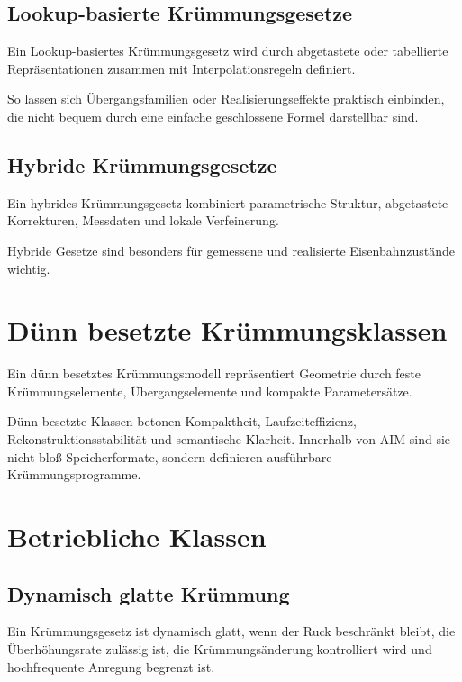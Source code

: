 \subsection{Lookup-basierte Krümmungsgesetze}
\begin{definition}
\label{def:lookup-based-curvature}
Ein Lookup-basiertes Krümmungsgesetz wird durch abgetastete oder tabellierte
Repräsentationen zusammen mit Interpolationsregeln definiert.
\end{definition}
So lassen sich Übergangsfamilien oder Realisierungseffekte praktisch
einbinden, die nicht bequem durch eine einfache geschlossene Formel
darstellbar sind.

\subsection{Hybride Krümmungsgesetze}
\begin{definition}
\label{def:hybrid-curvature-law}
Ein hybrides Krümmungsgesetz kombiniert parametrische Struktur, abgetastete
Korrekturen, Messdaten und lokale Verfeinerung.
\end{definition}
Hybride Gesetze sind besonders für gemessene und realisierte
Eisenbahnzustände wichtig.

\section{Dünn besetzte Krümmungsklassen}

\begin{definition}
\label{def:sparse-curvature-class}
Ein dünn besetztes Krümmungsmodell repräsentiert Geometrie durch feste
Krümmungselemente, Übergangselemente und kompakte Parametersätze.
\end{definition}

Dünn besetzte Klassen betonen Kompaktheit, Laufzeiteffizienz,
Rekonstruktionsstabilität und semantische Klarheit. Innerhalb von AIM sind sie
nicht bloß Speicherformate, sondern definieren ausführbare
Krümmungsprogramme.

\section{Betriebliche Klassen}

\subsection{Dynamisch glatte Krümmung}
\begin{definition}
\label{def:dynamically-smooth-curvature}
Ein Krümmungsgesetz ist dynamisch glatt, wenn der Ruck beschränkt bleibt, die
Überhöhungsrate zulässig ist, die Krümmungsänderung kontrolliert wird und
hochfrequente Anregung begrenzt ist.
\end{definition}


